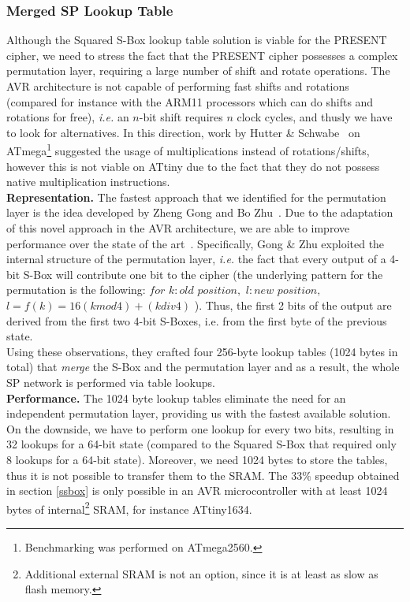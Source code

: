 \documentclass[11pt]{llncs2e} %
\begin{document}
\subsubsection{Merged SP Lookup Table}\label{msbox}
Although the Squared S-Box lookup table solution is viable for the PRESENT cipher, we need to stress the fact that the PRESENT cipher possesses a complex permutation layer, requiring a large number of shift and rotate operations. The AVR architecture is not capable of performing fast shifts and rotations (compared for instance with the ARM11 processors which can do shifts and rotations for free),  \emph{i.e.} an $n$-bit shift requires $n$ clock cycles, and thusly we have to look for alternatives.
In this direction, work by Hutter \& Schwabe~\cite{hutternacl} on ATmega\footnote{Benchmarking was performed on ATmega2560.} suggested the usage of multiplications instead of rotations/shifts, however this is not viable on ATtiny due to the fact that they do not possess native multiplication instructions.\\
\textbf{Representation.} The fastest approach that we identified for the permutation layer is the idea developed by Zheng Gong and Bo Zhu~\cite{gong_code,gong2009towards}. Due to the adaptation of this novel approach in the AVR architecture, we are able to improve performance over the state of the art~\cite{eisenbarth2012compact}. Specifically, Gong \& Zhu exploited the internal structure of the permutation layer, \emph{i.e.} the fact that every output of a 4-bit S-Box will contribute one bit to the cipher (the underlying pattern for the permutation is the following: $for$ $k:old$ $position,$ $l:new$ $position,$ $l=f(k)=16(k mod 4)+(k div 4)$ ). Thus, the first 2 bits of the output are derived from the first two 4-bit S-Boxes, i.e. from the first byte of the previous state. \\
Using these observations, they crafted four 256-byte lookup tables (1024 bytes in total) that \emph{merge} the S-Box and the permutation layer and as a result, the whole SP network is performed via table lookups.\\
\textbf{Performance.} The 1024 byte lookup tables eliminate the need for an independent permutation layer, providing us with the fastest available solution. On the downside, we have to perform one lookup for every two bits, resulting in 32 lookups for a 64-bit state (compared to the Squared S-Box that required only 8 lookups for a 64-bit state). Moreover, we need 1024 bytes to store the tables, thus it is not possible to transfer them to the SRAM. The 33\% speedup obtained in section \ref{ssbox} is only possible in an AVR microcontroller with at least 1024 bytes of internal\footnote{Additional external SRAM is not an option, since it is at least as slow as flash memory.} SRAM, for instance ATtiny1634.\\
\end{document}
